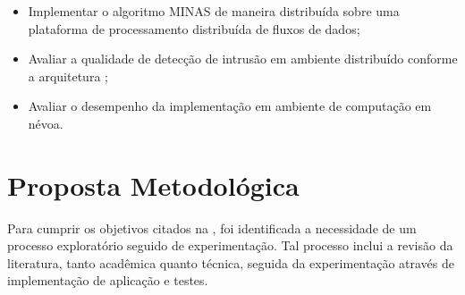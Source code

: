 


\begin{itemize}

    \item Implementar o algoritmo MINAS de maneira distribuída sobre uma plataforma de processamento
    distribuída de fluxos de dados;

    \item Avaliar a qualidade de detecção de intrusão em ambiente distribuído 
    conforme a arquitetura \idsiot;
    
    \item Avaliar o desempenho da implementação em ambiente de computação em névoa.

\end{itemize}


\section{Proposta Metodológica}


Para cumprir os objetivos citados na , foi identificada a necessidade
de um processo exploratório seguido de experimentação. Tal processo inclui a
revisão da literatura, tanto acadêmica quanto técnica, seguida da experimentação
através de implementação de aplicação e testes.

